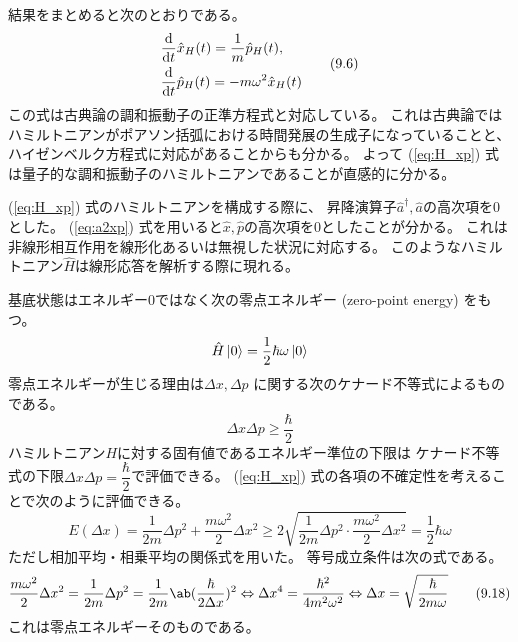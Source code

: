 結果をまとめると次のとおりである。
\begin{equation}
  \begin{split}
    &\odv{}{t}\hat{x}_H(t)=\frac{1}{m}\hat{p}_H(t), \\
    &\odv{}{t}\hat{p}_H(t)=-m\omega^2\hat{x}_H(t)
  \end{split}
  \tag{9.6}
\end{equation}
この式は古典論の調和振動子の正準方程式と対応している。
これは古典論ではハミルトニアンがポアソン括弧における時間発展の生成子になっていることと、
ハイゼンベルク方程式に対応があることからも分かる。
よって (\ref{eq:H_xp}) 式は量子的な調和振動子のハミルトニアンであることが直感的に分かる。

(\ref{eq:H_xp}) 式のハミルトニアンを構成する際に、
昇降演算子$\hat{a}^\dagger,\hat{a}$の高次項を0とした。
(\ref{eq:a2xp}) 式を用いると$\hat{x},\hat{p}$の高次項を0としたことが分かる。
これは非線形相互作用を線形化あるいは無視した状況に対応する。
このようなハミルトニアン$\hat{H}$は線形応答を解析する際に現れる。

基底状態はエネルギー0ではなく次の零点エネルギー (zero-point energy) をもつ。
\begin{equation}
  \hat{H}\ket{0} = \frac{1}{2}\hbar\omega\ket{0}
\end{equation}
零点エネルギーが生じる理由は$\Delta x,\Delta p$ に関する次のケナード不等式によるものである。
\begin{equation}
  \Delta x \Delta p\geq\frac{\hbar}{2}
\end{equation}
ハミルトニアン$H$に対する固有値であるエネルギー準位の下限は
ケナード不等式の下限$\Delta x\Delta p=\dfrac{\hbar}{2}$で評価できる。
(\ref{eq:H_xp}) 式の各項の不確定性を考えることで次のように評価できる。
\begin{equation}
  E(\Delta x)
  =\frac{1}{2m}\Delta p^2+\frac{m\omega^2}{2}\Delta x^2
  \geq2\sqrt{\frac{1}{2m}\Delta p^2\cdot\frac{m\omega^2}{2}\Delta x^2}
  =\frac{1}{2}\hbar\omega
\end{equation}
ただし相加平均・相乗平均の関係式を用いた。
等号成立条件は次の式である。
\begin{equation}
  \frac{m\omega^2}{2}\Delta x^2
  =\frac{1}{2m}\Delta p^2
  =\frac{1}{2m}\ab(\frac{\hbar}{2\Delta x})^2
  \Leftrightarrow
  \Delta x^4 = \frac{\hbar^2}{4m^2\omega^2}
  \Leftrightarrow
  \Delta x = \sqrt{\frac{\hbar}{2m\omega}}
  \tag{9.18}
\end{equation}
これは零点エネルギーそのものである。

